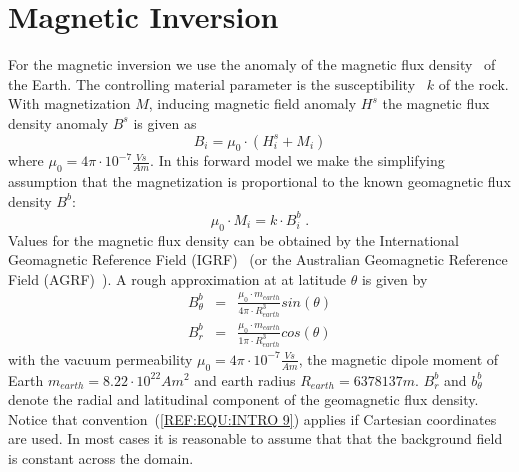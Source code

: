 
%
%
%


\section{Magnetic Inversion}\label{sec:forward magnetic}
For the magnetic inversion we use the anomaly of the magnetic flux density~ of the Earth.
The controlling material parameter
is the susceptibility~ $k$ of the rock. With magnetization $M$,
inducing magnetic field anomaly $H^s$ the magnetic flux density anomaly $B^s$ is given as
\begin{equation}\label{ref:EQU:1}
B_i = \mu_0 \cdot ( H^s_i  + M_i )
\end{equation}
where $\mu_0 = 4 \pi \cdot 10^{-7} \frac{Vs}{Am}$.
In this forward model we make the simplifying assumption that the magnetization is proportional to
the known geomagnetic
 flux density $B^b$:
\begin{equation}\label{ref:EQU:4}
\mu_0  \cdot M_i = k \cdot B^b_i \;. 
\end{equation}
Values for the magnetic flux density
can be obtained by the International Geomagnetic Reference Field (IGRF)~\cite{IGRF}
(or the Australian Geomagnetic Reference Field (AGRF)~\cite{AGRF}). A rough approximation at 
at latitude $\theta$ is given by 
\begin{equation}\label{ref:EQU:5}
\begin{array}{rcl}
B^b_{\theta}  & = & \displaystyle{ \frac{ \mu_0 \cdot m_{earth}}{4 \pi \cdot R_{earth}^3} sin(\theta) }  \\
B^b_r & = & \displaystyle{ \frac{\mu_0 \cdot  m_{earth}}{1 \pi \cdot R_{earth}^3} cos(\theta) }
\end{array}
\end{equation}
with the vacuum permeability  $\mu_0 = 4 \pi \cdot 10^{-7} \frac{Vs}{Am}$, 
the magnetic dipole moment of Earth $m_{earth}= 8.22 \cdot 10^{22} Am^2$ and earth radius $R_{earth}= 6378137m$.
$B^b_r$ and $b^b_{\theta}$ denote the radial and latitudinal component of the geomagnetic
 flux density.
Notice that convention~(\ref{REF:EQU:INTRO 9}) applies if Cartesian coordinates are used. 
In most cases it is reasonable to assume that that the background field is constant across the domain.

